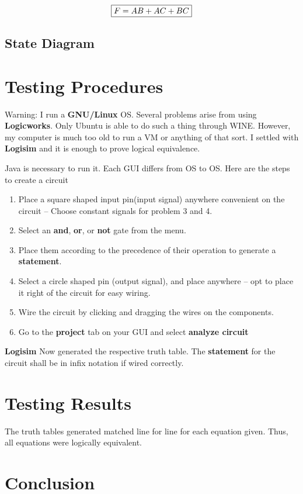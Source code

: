 \documentclass[10pt]{IEEEtran} %
\begin{document}
\[\framebox{\(F = AB + AC + BC\)}\]

\subsection{State Diagram}
\section{Testing Procedures}
Warning: I run a \textbf{GNU/Linux} OS. Several problems arise from using \textbf{Logicworks}. Only Ubuntu is able to do such a thing through WINE. However, my computer is much too old to run a VM or anything of that sort. I settled with \textbf{Logisim} and it is enough to prove logical equivalence.

Java is necessary to run it. Each GUI differs from OS to OS. Here are the steps to create a circuit
\begin{enumerate}
    \item Place a square shaped input pin(input signal) anywhere convenient on the circuit -- Choose constant signals for problem 3 and 4.
    \item Select an \textbf{and}, \textbf{or}, or \textbf{not} gate from the menu.
    \item Place them according to the precedence of their operation to generate a \textbf{statement}.
    \item Select a circle shaped pin (output signal), and place anywhere -- opt to place it right of the circuit for easy wiring.
    \item Wire the circuit by clicking and dragging the wires on the components.
    \item Go to the \textbf{project} tab on your GUI and select \textbf{analyze circuit}
\end{enumerate}
\textbf{Logisim} Now generated the respective truth table. The \textbf{statement} for the circuit shall be in infix notation if wired correctly.
\section{Testing Results}
The truth tables generated matched line for line for each equation given. Thus, all equations were logically equivalent.
\section{Conclusion}
\kant[42]
\end{document}
